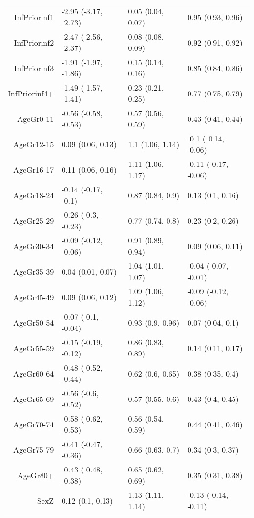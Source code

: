 \begin{table}[ht]
\begin{tabular}{rlll}
  InfPriorinf1 & -2.95 (-3.17, -2.73) & 0.05 (0.04, 0.07) & 0.95 (0.93, 0.96) \\ 
  InfPriorinf2 & -2.47 (-2.56, -2.37) & 0.08 (0.08, 0.09) & 0.92 (0.91, 0.92) \\ 
  InfPriorinf3 & -1.91 (-1.97, -1.86) & 0.15 (0.14, 0.16) & 0.85 (0.84, 0.86) \\ 
  InfPriorinf4+ & -1.49 (-1.57, -1.41) & 0.23 (0.21, 0.25) & 0.77 (0.75, 0.79) \\ 
  AgeGr0-11 & -0.56 (-0.58, -0.53) & 0.57 (0.56, 0.59) & 0.43 (0.41, 0.44) \\ 
  AgeGr12-15 & 0.09 (0.06, 0.13) & 1.1 (1.06, 1.14) & -0.1 (-0.14, -0.06) \\ 
  AgeGr16-17 & 0.11 (0.06, 0.16) & 1.11 (1.06, 1.17) & -0.11 (-0.17, -0.06) \\ 
  AgeGr18-24 & -0.14 (-0.17, -0.1) & 0.87 (0.84, 0.9) & 0.13 (0.1, 0.16) \\ 
  AgeGr25-29 & -0.26 (-0.3, -0.23) & 0.77 (0.74, 0.8) & 0.23 (0.2, 0.26) \\ 
  AgeGr30-34 & -0.09 (-0.12, -0.06) & 0.91 (0.89, 0.94) & 0.09 (0.06, 0.11) \\ 
  AgeGr35-39 & 0.04 (0.01, 0.07) & 1.04 (1.01, 1.07) & -0.04 (-0.07, -0.01) \\ 
  AgeGr45-49 & 0.09 (0.06, 0.12) & 1.09 (1.06, 1.12) & -0.09 (-0.12, -0.06) \\ 
  AgeGr50-54 & -0.07 (-0.1, -0.04) & 0.93 (0.9, 0.96) & 0.07 (0.04, 0.1) \\ 
  AgeGr55-59 & -0.15 (-0.19, -0.12) & 0.86 (0.83, 0.89) & 0.14 (0.11, 0.17) \\ 
  AgeGr60-64 & -0.48 (-0.52, -0.44) & 0.62 (0.6, 0.65) & 0.38 (0.35, 0.4) \\ 
  AgeGr65-69 & -0.56 (-0.6, -0.52) & 0.57 (0.55, 0.6) & 0.43 (0.4, 0.45) \\ 
  AgeGr70-74 & -0.58 (-0.62, -0.53) & 0.56 (0.54, 0.59) & 0.44 (0.41, 0.46) \\ 
  AgeGr75-79 & -0.41 (-0.47, -0.36) & 0.66 (0.63, 0.7) & 0.34 (0.3, 0.37) \\ 
  AgeGr80+ & -0.43 (-0.48, -0.38) & 0.65 (0.62, 0.69) & 0.35 (0.31, 0.38) \\ 
  SexZ & 0.12 (0.1, 0.13) & 1.13 (1.11, 1.14) & -0.13 (-0.14, -0.11) \\ 
   \hline
\end{tabular}
\end{table}

